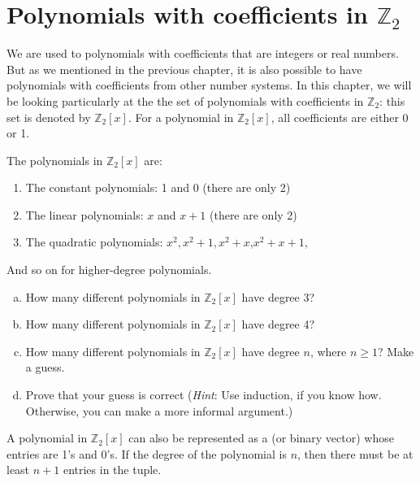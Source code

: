 

\section{Polynomials with coefficients in $\mathbb{Z}_2$}\label{sec:polycodes:1}
We are used to polynomials with coefficients that are integers or real numbers. But as we mentioned in the previous chapter, it is also possible to have polynomials with coefficients from other number systems. In this chapter, we will be looking particularly 
at the the set of polynomials with coefficients in  $\mathbb{Z}_2$: this set is denoted by $\mathbb{Z}_2[x]$.
For a polynomial in $\mathbb{Z}_2[x]$, all coefficients are either 0 or 1.

\begin{example}{}
The polynomials in $\mathbb{Z}_2[x]$ are:
\begin{enumerate}[.]
\item
The constant polynomials: 1 and 0 (there are only 2)
\item
The linear polynomials: $x$ and $x+1$ (there are only 2)
\item
The quadratic polynomials: $x^2, x^2+1, x^2 + x$,$x^2 + x+1$,
\end {enumerate}
And so on for higher-degree polynomials.
\end {example}

\begin{exercise}{}
\begin{enumerate}[(a)]
\item
How many different polynomials in $\mathbb{Z}_2[x]$ have degree 3?
\item
How many different polynomials in $\mathbb{Z}_2[x]$ have degree 4?
\item
How  many different polynomials in $\mathbb{Z}_2[x]$ have degree $n$, where $n \ge 1$?  Make a guess.
\item
Prove that your guess is correct (\emph{Hint}: Use induction, if you know how.  Otherwise, you can make a more informal argument.)
\end{enumerate}
\end{exercise}

A polynomial in $\mathbb{Z}_2[x]$ can also be represented as a  (or binary vector) whose entries are 1's and 0's. If the degree of the polynomial is $n$, then there must be at least $n+1$ entries in the tuple.


